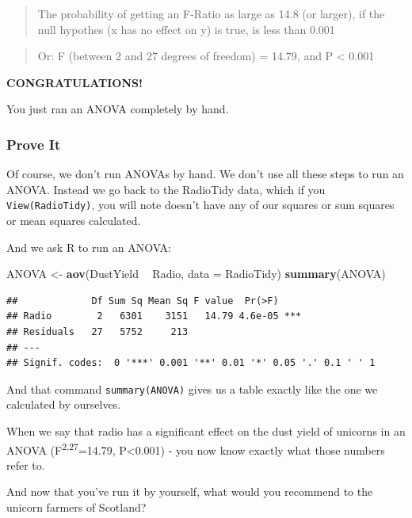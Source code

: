\documentclass[
]{book}
\newenvironment{Shaded}{\begin{snugshade}}{\end{snugshade}}
\newcommand{\DataTypeTok}[1]{\textcolor[rgb]{0.13,0.29,0.53}{#1}}
\newcommand{\KeywordTok}[1]{\textcolor[rgb]{0.13,0.29,0.53}{\textbf{#1}}}
\newcommand{\NormalTok}[1]{#1}
\newcommand{\OperatorTok}[1]{\textcolor[rgb]{0.81,0.36,0.00}{\textbf{#1}}}
\newcommand{\StringTok}[1]{\textcolor[rgb]{0.31,0.60,0.02}{#1}}
\begin{document}
\begin{quote}
The probability of getting an F-Ratio as large as 14.8 (or larger), if the null hypothes (x has no effect on y) is true, is less than 0.001
\end{quote}

\begin{quote}
Or: F (between 2 and 27 degrees of freedom) = 14.79, and P \textless{} 0.001
\end{quote}

\textbf{CONGRATULATIONS!}

You just ran an ANOVA completely by hand.

\hypertarget{prove-it}{%
\subsubsection{Prove It}\label{prove-it}}

Of course, we don't run ANOVAs by hand. We don't use all these steps to run an ANOVA. Instead we go back to the RadioTidy data, which if you \texttt{View(RadioTidy)}, you will note doesn't have any of our squares or sum squares or mean squares calculated.

And we ask R to run an ANOVA:

\begin{Shaded}
\begin{Highlighting}[]
\NormalTok{ANOVA <-}\StringTok{ }\KeywordTok{aov}\NormalTok{(DustYield }\OperatorTok{~}\StringTok{ }\NormalTok{Radio, }\DataTypeTok{data =}\NormalTok{ RadioTidy)}
\KeywordTok{summary}\NormalTok{(ANOVA)}
\end{Highlighting}
\end{Shaded}

\begin{verbatim}
##             Df Sum Sq Mean Sq F value  Pr(>F)    
## Radio        2   6301    3151   14.79 4.6e-05 ***
## Residuals   27   5752     213                    
## ---
## Signif. codes:  0 '***' 0.001 '**' 0.01 '*' 0.05 '.' 0.1 ' ' 1
\end{verbatim}

And that command \texttt{summary(ANOVA)} gives us a table exactly like the one we calculated by ourselves.

When we say that radio has a significant effect on the dust yield of unicorns in an ANOVA (F\textsuperscript{2,27}=14.79, P\textless{}0.001) - you now know exactly what those numbers refer to.

And now that you've run it by yourself, what would you recommend to the unicorn farmers of Scotland?
\end{document}
